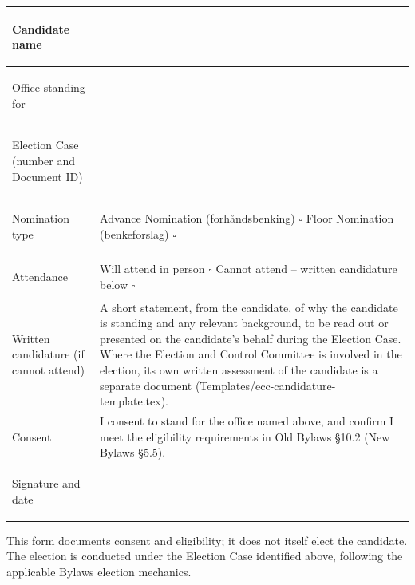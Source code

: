 \documentclass{../../Common/Latex/Templates/rapport}
\begin{document}
\vspace{0.4cm}
\begin{tabularx}{\textwidth}{|>{\bfseries\raggedright\arraybackslash}p{4.2cm}|X|}
  \hline
  Candidate name                         & \rule{0pt}{1.2cm}                                                                                                                                                                \\
  \hline
  Office standing for                    & \rule{0pt}{1.2cm}                                                                                                                                                                \\
  \hline
  Election Case (number and Document ID) & \rule{0pt}{1.2cm}                                                                                                                                                                \\
  \hline
  Nomination type                        & \rule{0pt}{1.2cm}Advance Nomination (forhåndsbenking) \quad $\square$ \quad Floor Nomination (benkeforslag) \quad $\square$                                                      \\
  \hline
  Attendance                             & \rule{0pt}{1.2cm}Will attend in person \quad $\square$ \quad Cannot attend -- written candidature below \quad $\square$                                                          \\
  \hline
  Written candidature (if cannot attend) & \rule{0pt}{3.2cm}A short statement, from the candidate, of why the candidate is standing and any relevant background, to be read out or presented on the candidate's behalf during the Election Case. Where the Election and Control Committee is involved in the election, its own written assessment of the candidate is a separate document (Templates/ecc-candidature-template.tex). \\
  \hline
  Consent                                & \rule{0pt}{1.6cm}I consent to stand for the office named above, and confirm I meet the eligibility requirements in Old Bylaws \S10.2 (New Bylaws \S5.5).                         \\
  \hline
  Signature and date                     & \rule{0pt}{1.4cm}                                                                                                                                                                \\
  \hline
\end{tabularx}

\vfill
This form documents consent and eligibility; it does not itself elect the candidate. The election is conducted under the Election Case identified above, following the applicable Bylaws election mechanics.
\end{document}
